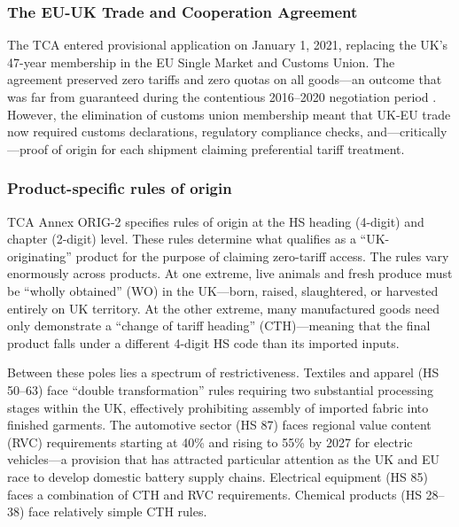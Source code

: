 \documentclass[12pt]{article}
\begin{document}
\subsubsection*{The EU-UK Trade and Cooperation Agreement} The TCA entered provisional application on January 1, 2021, replacing the UK's 47-year membership in the EU Single Market and Customs Union. The agreement preserved zero tariffs and zero quotas on all goods---an outcome that was far from guaranteed during the contentious 2016--2020 negotiation period \citep{dhingra2022}. However, the elimination of customs union membership meant that UK-EU trade now required customs declarations, regulatory compliance checks, and---critically---proof of origin for each shipment claiming preferential tariff treatment.

\subsubsection*{Product-specific rules of origin} TCA Annex ORIG-2 specifies rules of origin at the HS heading (4-digit) and chapter (2-digit) level. These rules determine what qualifies as a ``UK-originating'' product for the purpose of claiming zero-tariff access. The rules vary enormously across products. At one extreme, live animals and fresh produce must be ``wholly obtained'' (WO) in the UK---born, raised, slaughtered, or harvested entirely on UK territory. At the other extreme, many manufactured goods need only demonstrate a ``change of tariff heading'' (CTH)---meaning that the final product falls under a different 4-digit HS code than its imported inputs.

Between these poles lies a spectrum of restrictiveness. Textiles and apparel (HS 50--63) face ``double transformation'' rules requiring two substantial processing stages within the UK, effectively prohibiting assembly of imported fabric into finished garments. The automotive sector (HS 87) faces regional value content (RVC) requirements starting at 40\% and rising to 55\% by 2027 for electric vehicles---a provision that has attracted particular attention as the UK and EU race to develop domestic battery supply chains. Electrical equipment (HS 85) faces a combination of CTH and RVC requirements. Chemical products (HS 28--38) face relatively simple CTH rules.
\end{document}
